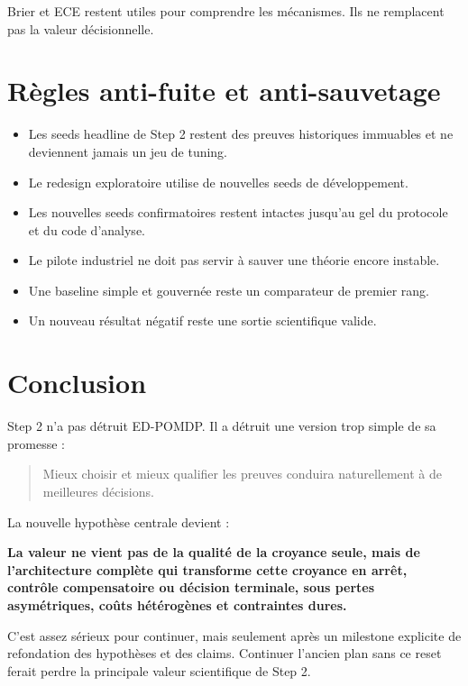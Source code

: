 \documentclass[11pt,a4paper]{article}
\begin{document}
Brier et ECE restent utiles pour comprendre les mécanismes. Ils ne remplacent pas la valeur décisionnelle.

\section{Règles anti-fuite et anti-sauvetage}

\begin{itemize}
  \item Les seeds headline de Step 2 restent des preuves historiques immuables et ne deviennent jamais un jeu de tuning.
  \item Le redesign exploratoire utilise de nouvelles seeds de développement.
  \item Les nouvelles seeds confirmatoires restent intactes jusqu'au gel du protocole et du code d'analyse.
  \item Le pilote industriel ne doit pas servir à sauver une théorie encore instable.
  \item Une baseline simple et gouvernée reste un comparateur de premier rang.
  \item Un nouveau résultat négatif reste une sortie scientifique valide.
\end{itemize}

\section{Conclusion}

Step 2 n'a pas détruit ED-POMDP. Il a détruit une version trop simple de sa promesse :
\begin{quote}
Mieux choisir et mieux qualifier les preuves conduira naturellement à de meilleures décisions.
\end{quote}

La nouvelle hypothèse centrale devient :

\begin{tcolorbox}[colback=softgreen,colframe=green!45!black,boxrule=0.8pt,arc=2mm]
\textbf{La valeur ne vient pas de la qualité de la croyance seule, mais de l'architecture complète qui transforme cette croyance en arrêt, contrôle compensatoire ou décision terminale, sous pertes asymétriques, coûts hétérogènes et contraintes dures.}
\end{tcolorbox}

C'est assez sérieux pour continuer, mais seulement après un milestone explicite de refondation des hypothèses et des claims. Continuer l'ancien plan sans ce reset ferait perdre la principale valeur scientifique de Step 2.
\end{document}
